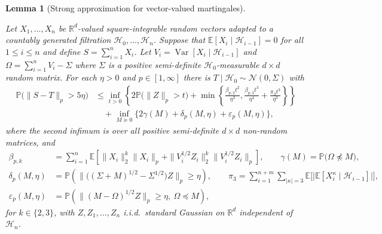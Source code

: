 \documentclass[11pt,lof]{puthesis}
\renewcommand{\P}{\ensuremath{\mathbb{P}}}
\newcommand{\R}{\ensuremath{\mathbb{R}}}
\newcommand{\E}{\ensuremath{\mathbb{E}}}
\newcommand{\cH}{\ensuremath{\mathcal{H}}}
\newcommand{\cN}{\ensuremath{\mathcal{N}}}
\DeclareMathOperator{\Var}{Var}
\theoremstyle{break}
\newtheorem{lemma}{Lemma}[section]
\theoremstyle{proof}
\begin{document}
\begin{lemma}[Strong approximation for vector-valued martingales]%
  \label{lem:yurinskii_app_sa_martingale}

  Let $X_1, \ldots, X_n$ be $\R^d$-valued
  square-integrable random vectors
  adapted to a countably generated
  filtration $\cH_0, \ldots, \cH_n$.
  Suppose that
  $\E[X_i \mid \cH_{i-1}] = 0$ for all $1 \leq i \leq n$
  and define $S = \sum_{i=1}^n X_i$.
  Let $V_i = \Var[X_i \mid \cH_{i-1}]$ and
  $\Omega = \sum_{i=1}^n V_i - \Sigma$
  where $\Sigma$ is a positive semi-definite
  $\cH_0$-measurable $d \times d$ random matrix.
  For each $\eta > 0$ and $p \in [1,\infty]$
  there is $T \mid \cH_0 \sim \cN(0, \Sigma)$ with
  \begin{align*}
    \P\big(\|S-T\|_p > 5\eta\big)
    &\leq
    \inf_{t>0}
    \left\{
      2 \P\big( \|Z\|_p > t \big)
      + \min\left\{
        \frac{\beta_{p,2} t^2}{\eta^3},
        \frac{\beta_{p,3} t^3}{\eta^4}
        + \frac{\pi_3 t^3}{\eta^3}
      \right\}
    \right\} \\
    \nonumber
    &\quad+
    \inf_{M \succeq 0}
    \big\{ 2\gamma(M) + \delta_p(M,\eta)
    + \varepsilon_p(M, \eta)\big\},
  \end{align*}
  where the second infimum is over all positive semi-definite
  $d \times d$ non-random matrices, and
  \begin{align*}
    \beta_{p,k}
    &=
    \sum_{i=1}^n \E\left[\| X_i \|^k_2 \| X_i \|_p
    + \|V_i^{1/2} Z_i \|^k_2 \|V_i^{1/2} Z_i \|_p \right],
    \qquad\gamma(M)
    = \P\big(\Omega \npreceq M\big), \\
    \delta_p(M,\eta)
    &=
    \P\left(
      \big\|\big((\Sigma +M)^{1/2}- \Sigma^{1/2}\big) Z\big\|_p
      \geq \eta
    \right),
    \qquad\pi_3
    =
    \sum_{i=1}^{n+m}
    \sum_{|\kappa| = 3}
    \E \Big[ \big|
      \E \left[ X_i^\kappa \mid \cH_{i-1} \right]
    \big| \Big], \\
    \varepsilon_p(M, \eta)
    &=
    \P\left(\big\| (M - \Omega)^{1/2} Z \big\|_p\geq \eta, \
    \Omega \preceq M\right),
  \end{align*}
  for $k \in \{2,3\}$, with $Z, Z_1,\dots ,Z_n$ i.i.d.\ standard Gaussian
  on $\R^d$ independent of $\cH_n$.
\end{lemma}
\end{document}
